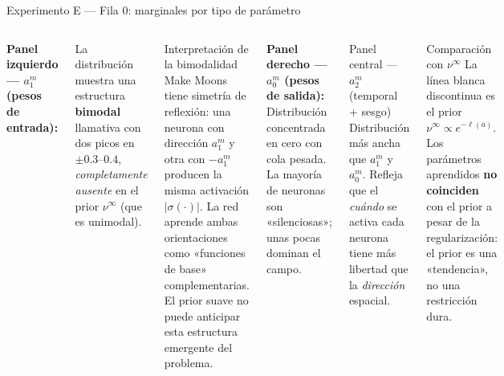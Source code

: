 \documentclass[10pt]{beamer}
\begin{document}
\begin{frame}{Experimento E — Fila 0: marginales por tipo de parámetro}

\begin{columns}

\textbf{Panel izquierdo — $a_1^m$ (pesos de entrada):}

La distribución muestra una estructura \textbf{bimodal} llamativa con dos picos en $\pm 0.3$--$0.4$, \emph{completamente ausente} en el prior $\nu^\infty$ (que es unimodal).

\begin{alertblock}{Interpretación de la bimodalidad}
  Make Moons tiene simetría de reflexión: una neurona con dirección $a_1^m$ y otra con $-a_1^m$ producen la misma activación $|\sigma(\cdot)|$. La red aprende ambas orientaciones como «funciones de base» complementarias. El prior suave no puede anticipar esta estructura emergente del problema.
\end{alertblock}

\medskip
\textbf{Panel derecho — $a_0^m$ (pesos de salida):}
Distribución concentrada en cero con cola pesada. La mayoría de neuronas son «silenciosas»; unas pocas dominan el campo.

\begin{block}{Panel central — $a_2^m$ (temporal + sesgo)}
  Distribución más ancha que $a_1^m$ y $a_0^m$. Refleja que el \emph{cuándo} se activa cada neurona tiene más libertad que la \emph{dirección} espacial.
\end{block}

\medskip
\begin{block}{Comparación con $\nu^\infty$}
  La línea blanca discontinua es el prior $\nu^\infty\propto e^{-\ell(a)}$. Los parámetros aprendidos \textbf{no coinciden} con el prior a pesar de la regularización: el prior es una «tendencia», no una restricción dura.
\end{block}
\end{columns}

\end{frame}
\end{document}
